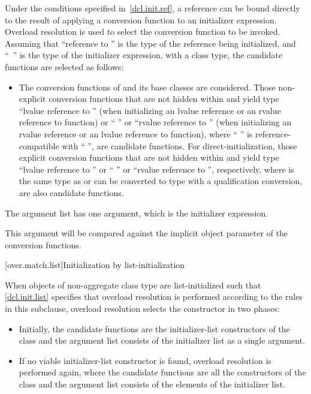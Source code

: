 \pnum
Under the conditions specified in~\ref{dcl.init.ref}, a reference can be bound directly
to the result of applying a conversion
function to an initializer expression.
Overload resolution is used to select the
conversion function to be invoked.
Assuming that ``reference to  '' is the
type of the reference being initialized, and
``\cv{}~'' is the type
of the initializer expression, with
a class type,
the candidate functions are selected as follows:
\begin{itemize}
\item
The conversion functions of
and its base classes are considered.
Those non-explicit conversion functions that are not hidden within
and yield type ``lvalue reference to  ''
(when initializing an lvalue reference or an rvalue reference to function) or
`` ''
or ``rvalue reference to  '' (when initializing an
rvalue reference or an lvalue reference to function),
where `` '' is reference-compatible
with `` '',
are candidate functions. For direct-initialization, those explicit
conversion functions that are not hidden within  and yield
type ``lvalue reference to  '' or ``
'' or ``rvalue reference to  '',
respectively, where  is the same type as  or can be
converted to type  with a qualification
conversion, are also candidate functions.

\end{itemize}

\pnum
The argument list has one argument, which is the initializer expression.
\begin{note}
This argument will be compared against
the implicit object parameter of the conversion functions.
\end{note}

[over.match.list]{Initialization by list-initialization}%

\pnum
When objects of non-aggregate class type  are
list-initialized such that \ref{dcl.init.list} specifies that overload resolution
is performed according to the rules in this subclause, overload resolution selects the
constructor in two phases:

\begin{itemize}
\item
Initially, the candidate functions are the initializer-list constructors
of the class  and
the argument list consists of the initializer list as a single argument.

\item
If no viable initializer-list constructor is found, overload resolution is
performed again, where the candidate functions are all the constructors of
the class  and
the argument list consists of the elements of the initializer list.
\end{itemize}

